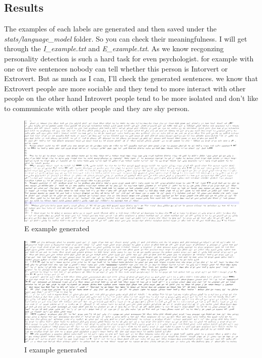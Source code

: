 \documentclass[10pt, a4paper]{article}
\begin{document}
\subsection{Results}
The examples of each labels are generated and then saved under the \textit{stats/language\_model} folder. So you can check their meaningfulness. I will get through the
\textit{I\_example.txt} and \textit{E\_example.txt}. As we know recgonzing personality detection is such a hard task for even psychologist. for example with one or five sentences
nobody can tell whether this person is Intorvert or Extrovert. But as much as I can, I'll check the generated sentences. we know that Extrovert people are more sociable and they tend to more
interact with other people on the other hand Introvert people tend to be more isolated and don't like to communicate with other people and they are shy person.
\begin{figure}[H]
    \begin{center}
        \includegraphics[width=1\linewidth]{../../stats/language_model/E_example.png}
        \caption{E example generated}
    \end{center}
\end{figure}
\begin{figure}[H]
    \begin{center}
        \includegraphics[width=1\linewidth]{../../stats/language_model/I_example.png}
        \caption{I example generated}
    \end{center}
\end{figure}
\end{document}
